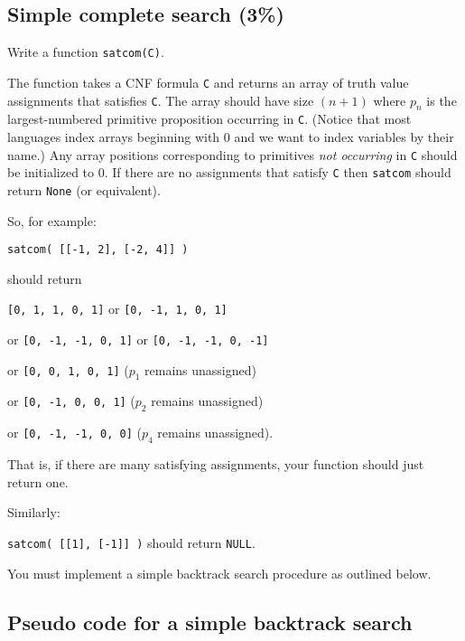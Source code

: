\documentclass[12pt]{article}
\begin{document}
\subsection{Simple complete search \rm(3\%)}
Write a function {\tt satcom(C)}.

The function takes a CNF formula {\tt C} 
and returns an array of truth value assignments 
that satisfies {\tt C}.  The array should have size $(n+1)$ where $p_n$
is the largest-numbered primitive proposition occurring in {\tt C}.
(Notice that most languages index arrays beginning with 0 and we want to index
variables by their name.)
Any array positions corresponding to primitives \emph{not occurring} in {\tt C}
should be initialized to 0.
If there are no assignments that satisfy {\tt C} then {\tt satcom} should return {\tt None} (or equivalent).

\medskip

So, for example:

{\tt satcom( [[-1, 2], [-2, 4]] ) }

should return

\medskip

\hspace*{0.37cm}
{\tt [0, 1, 1, 0, 1]} \hspace{.93cm} or
{\tt [0, -1, 1, 0, 1]}\par or
{\tt [0, -1, -1, 0, 1]} \hspace*{.5cm} or
{\tt [0, -1, -1, 0, -1]}\par or
{\tt [0, 0, 1, 0, 1]} ($p_1$ remains unassigned)\par or
{\tt [0, -1, 0, 0, 1]} ($p_2$ remains unassigned)\par or
{\tt [0, -1, -1, 0, 0]} ($p_4$ remains unassigned).

\medskip

That is, if there are many satisfying assignments, your function
should just return one.

\bigskip

Similarly:

{\tt satcom( [[1], [-1]] )}
should return {\tt NULL}.

\bigskip

\noindent
You must implement a simple backtrack search procedure as outlined below.

\newpage

\subsection*{Pseudo code for a simple backtrack search}
\end{document}
